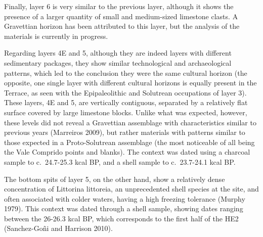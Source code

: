 \documentclass[12pt,twoside]{reedthesis}
\begin{document}
Finally, layer 6 is very similar to the previous layer, although it shows the presence of a larger quantity of small and medium-sized limestone clasts. A Gravettian horizon has been attributed to this layer, but the analysis of the materials is currently in progress.

Regarding layers 4E and 5, although they are indeed layers with different sedimentary packages, they show similar technological and archaeological patterns, which led to the conclusion they were the same cultural horizon (the opposite, one single layer with different cultural horizons is equally present in the Terrace, as seen with the Epipaleolithic and Solutrean occupations of layer 3). These layers, 4E and 5, are vertically contiguous, separated by a relatively flat surface covered by large limestone blocks. Unlike what was expected, however, these levels did not reveal a Gravettian assemblage with characteristics similar to previous years (Marreiros 2009), but rather materials with patterns similar to those expected in a Proto-Solutrean assemblage (the most noticeable of all being the Vale Comprido points and blanks). The context was dated using a charcoal sample to c.~24.7-25.3 kcal BP, and a shell sample to c.~23.7-24.1 kcal BP.

The bottom spits of layer 5, on the other hand, show a relatively dense concentration of Littorina littoreia, an unprecedented shell species at the site, and often associated with colder waters, having a high freezing tolerance (Murphy 1979). This context was dated through a shell sample, showing dates ranging between the 26-26.3 kcal BP, which corresponds to the first half of the HE2 (Sanchez-Goñi and Harrison 2010).
\end{document}
